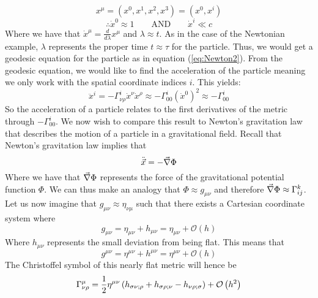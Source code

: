 \documentclass{article}
\begin{document}
 		$$ x^\mu = (x^0, x^1, x^2, x^3) = (x^0, x^i)$$
 		$$ \therefore \dot{x}^0 \approx 1 \quad\quad \text{AND} \quad\quad \dot{x}^i \ll c$$
 		Where we have that $\dot{x}^\mu = \frac{d}{d\lambda} x^\mu$ and $\lambda \approx t$. As in the case of the Newtonian example, $\lambda$ represents the proper time $t \approx \tau$ for the particle. Thus, we would get a geodesic equation for the particle as in equation (\ref{eq:Newton2}). From the geodesic equation, we would like to find the acceleration of the particle meaning we only work with the spatial coordinate indices $i$. This yields:
 		\begin{equation}
 			\label{eq:ParticleAcceleration}
 			\boxed{\ddot{x}^{i} = -\Gamma_{\nu\rho}^i \dot{x}^\nu \dot{x}^\rho \approx - \Gamma_{00}^i \left( \dot{x}^0 \right)^2 \approx - \Gamma_{00}^i}
 		\end{equation}
 		So the acceleration of a particle relates to the first derivatives of the metric through $-\Gamma_{00}^i$. We now wish to compare this result to Newton's gravitation law that describes the motion of a particle in a gravitational field. Recall that Newton's gravitation law implies that
 		\begin{equation}
 			\label{eq:NewtonGravitation}
 			\ddot{\vec{x}} = - \vec{\nabla} \Phi
 		\end{equation}
 		Where we have that $\vec{\nabla} \Phi$ represents the force of the gravitational potential function $\Phi$. We can thus make an analogy that $\Phi \approx g_{\mu\nu}$ and therefore $\vec{\nabla}\Phi \approx \Gamma_{ij}^k$. Let us now imagine that $g_{\mu\nu} \approx \eta_{\nu\mu}$ such that there exists a Cartesian coordinate system where
 		\begin{equation}
 			\label{eq:Deviation}
 			g_{\mu\nu} = \eta_{\mu\nu} + h_{\mu\nu} = \eta_{\mu\nu} + \mathcal{O}\left(h\right)
 		\end{equation}
 		Where $h_{\mu\nu}$ represents the small deviation from being flat. This means that 
 		\begin{equation}
 			\label{eq:InverseDeviation}
 			g^{\mu\nu} = \eta^{\mu\nu} + h^{\mu\nu} = \eta^{\mu\nu} + \mathcal{O}\left(h\right)
 		\end{equation}
 		The Christoffel symbol of this nearly flat metric will hence be
 		\begin{equation}
 			\label{eq:FlatChristoffels}
 			\Gamma_{\nu\rho}^{\mu} = \frac12 \eta^{\mu\nu} \left( h_{\sigma\nu;\rho} + h_{\sigma\rho;\nu} - h_{\nu\rho;\sigma} \right) + \mathcal{O} \left( h^2 \right)
 		\end{equation}
\end{document}
